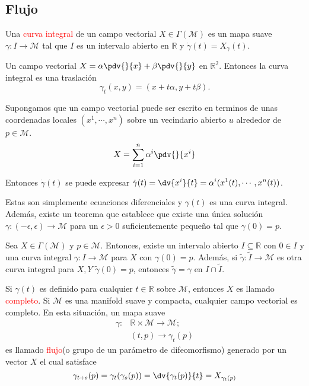 \documentclass[../main]{subfiles}
\begin{document}
\begin{adjustwidth}{0pt}{-100pt}
\subsection{Flujo}
Una \textcolor{red}{curva integral} de un campo vectorial $X \in \Gamma(\mathcal{M})$ es un mapa suave $\gamma: I\rightarrow \mathcal{M}$ tal que $I$ es un intervalo abierto en $\mathbb{R}$ y $\dot{\gamma}(t)=X_{\gamma}(t)$.

\ejemplo{} Un campo vectorial $\displaystyle X=\alpha \pdv{}{x}+\beta \pdv{}{y}$ en $\mathbb{R}^2$. Entonces la curva integral es una traslación
\begin{equation}
    \gamma_t(x, y)=(x+t\alpha, y+t\beta).
\end{equation}

Supongamos que un campo vectorial puede ser escrito en terminos de unas coordenadas locales $(x^1, \cdots, x^n)$ sobre un vecindario abierto $u$ alrededor de $p \in \mathcal{M}$.
\begin{equation}
    X=\sum_{i=1}^n \alpha^{i} \pdv{}{x^{i}}
\end{equation}

Entonces $\dot{\gamma}(t)$ se puede expresar $\displaystyle \dot{\gamma}(t)=\dv{x^{i}}{t}=\alpha^{i}(x^1(t), \cdots, x^n(t))$.

Estas son simplemente ecuaciones diferenciales y $\gamma(t)$ es una curva integral. Además, existe un teorema que establece que existe una única solución $\gamma:(-\epsilon, \epsilon) \rightarrow \mathcal{M}$ para un $\epsilon>0$ suficientemente pequeño tal que $\gamma(0)=p$.

 Sea $X \in \Gamma(\mathcal{M})$ y $p \in \mathcal{M}$. Entonces, existe un intervalo abierto $I \subseteq \mathbb{R}$ con $0 \in I$ y una curva integral $\gamma: I \rightarrow \mathcal{M}$ para $X$ con $\gamma(0)=p$. Además, si $\tilde{\gamma}: \tilde{I} \rightarrow \mathcal{M}$ es otra curva integral para $X, Y$ $\tilde{\gamma}(0)=p$, entonces $\tilde{\gamma}=\gamma$ en $I \cap \tilde{I}$.

Si $\gamma(t)$ es definido para cualquier $t \in \mathbb{R}$ sobre $\mathcal{M}$, entonces $X$ es llamado \textcolor{red}{completo}. Si $\mathcal{M}$ es una manifold suave y compacta, cualquier campo vectorial es completo. En esta situación, un mapa suave 
\begin{equation}
    \begin{split}
        \gamma:&\mathbb{R} \times \mathcal{M} \rightarrow \mathcal{M}; \\
        &(t, p) \rightarrow \gamma_t(p)
    \end{split}
\end{equation}
es llamado \textcolor{red}{flujo}(o grupo de un parámetro de difeomorfismo) generado por un vector $X$ el cual satisface 
\begin{equation}
    \gamma_{t+s}(p)=\gamma_t(\gamma_s(p))=\dv{\gamma_t(p)}{t}=X_{\gamma_t(p)}
\end{equation}


\end{adjustwidth}
\end{document}
